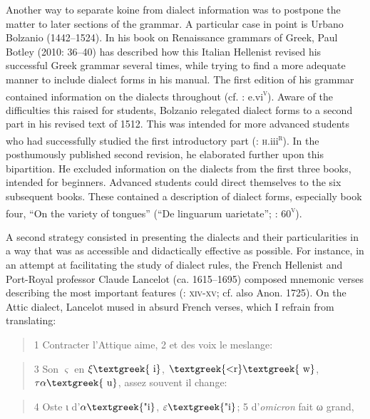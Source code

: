 \documentclass[output=paper]{langsci/langscibook}
\begin{document}
Another way to separate koine from dialect information was to postpone the matter to later sections of the grammar. A particular case in point is Urbano Bolzanio (1442–1524). In his book on Renaissance grammars of Greek, Paul Botley (2010: 36–40) has described how this Italian Hellenist revised his successful Greek grammar several times, while trying to find a more adequate manner to include dialect forms in his manual. The first edition of his grammar contained information on the dialects throughout (cf. \citealt{Bolzanio1497}: e.vi\textsc{\textsuperscript{v}}). Aware of the difficulties this raised for students, Bolzanio relegated dialect forms to a second part in his revised text of 1512. This was intended for more advanced students who had successfully studied the first introductory part (\citealt{Bolzanio1512}: \textsc{h}.iii\textsc{\textsuperscript{r}}). In the posthumously published second revision, he elaborated further upon this bipartition. He excluded information on the dialects from the first three books, intended for beginners. Advanced students could direct themselves to the six subsequent books. These contained a description of dialect forms, especially book four, “On the variety of tongues” (“De linguarum uarietate”; \citealt{Bolzanio1545}: 60\textsc{\textsuperscript{v}}).

A second strategy consisted in presenting the dialects and their particularities in a way that was as accessible and didactically effective as possible. For instance, in an attempt at facilitating the study of dialect rules, the French Hellenist and Port-Royal professor Claude Lancelot (ca. 1615–1695) composed mnemonic verses describing the most important features (\citealt{Lancelot1655}: \textsc{xiv-xv;} cf. also Anon. 1725). On the Attic dialect, Lancelot mused in absurd French verses, which I refrain from translating:

\begin{quote}
1 Contracter l’Attique aime, 2 et des voix le meslange:
\end{quote}

\begin{quote}
3 Son $\varsigma $ en $\xi \text{\textgreek{~i}}$, $\text{\textgreek{<r}}\text{\textgreek{~w}}$, $\tau \alpha \text{\textgreek{~u}}$, assez souvent il change:
\end{quote}

\begin{quote}
4 Oste ι d’$\alpha \text{\textgreek{"i}}$, $\varepsilon \text{\textgreek{"i}}$; 5 d’\textit{omicron} fait ω grand,
\end{quote}
\end{document}

